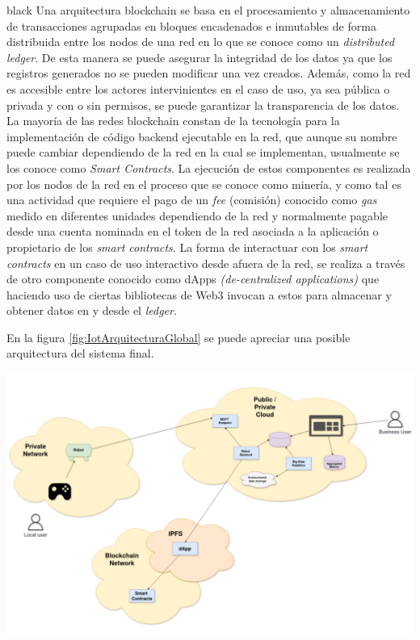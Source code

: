 \documentclass[
11pt, %
]{charter}
\begin{document}
\begin{consigna}{black}
Una arquitectura blockchain se basa en el procesamiento y almacenamiento de transacciones agrupadas en bloques encadenados e inmutables de forma distribuida entre los nodos de una red en lo que se conoce como un \textit{distributed ledger}. De esta manera se puede asegurar la integridad de los datos ya que los registros generados no se pueden modificar una vez creados. Además, como la red es accesible entre los actores intervinientes en el caso de uso, ya sea pública o privada y con o sin permisos, se puede garantizar la transparencia de los datos.
La mayoría de las redes blockchain constan de la tecnología para la implementación de código backend ejecutable en la red, que aunque su nombre puede cambiar dependiendo de la red en la cual se implementan, usualmente se los conoce como \textit{Smart Contracts}. La ejecución de estos componentes es realizada por los nodos de la red en el proceso que se conoce como minería, y como tal es una actividad que requiere el pago de un \textit{fee} (comisión) conocido como \textit{gas} medido en diferentes unidades dependiendo de la red y normalmente pagable desde una cuenta nominada en el token de la red asociada a la aplicación o propietario de los \textit{smart contracts}.
La  forma de interactuar con los \textit{smart contracts} en un caso de uso interactivo desde afuera de la red, se realiza a través de otro componente conocido como dApps \textit{(de-centralized applications)} que haciendo uso de ciertas bibliotecas de Web3 invocan a estos para almacenar y obtener datos en y desde el \textit{ledger}.

En la figura \ref{fig:IotArquitecturaGlobal} se puede apreciar una posible arquitectura del sistema final.

\begin{center}
 \includegraphics[scale=0.25]{Figuras/IoTProject-Page-1.drawio}
 \label{fig:IotArquitecturaGlobal}
\end{center}



\end{consigna}
\end{document}
